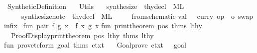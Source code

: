 %
\begin{isabellebody}%
%
%
\isadelimdocument
%
\endisadelimdocument
%
\isatagdocument
%
\isamarkuptrue%
%
\endisatagdocument
{\isafolddocument}%
%
\isadelimdocument
%
\endisadelimdocument
%
\isadelimtheory
%
\endisadelimtheory
%
\isatagtheory
{}\isamarkupfalse%
\ Synthetic{\isacharunderscore}{\kern0pt}Definition\isanewline
\ \ \ Utils\isanewline
\ \ \ {\isachardoublequoteopen}synthesize{\isachardoublequoteclose}\ {\isacharcolon}{\kern0pt}{\isacharcolon}{\kern0pt}\ thy{\isacharunderscore}{\kern0pt}decl\ {\isacharpercent}{\kern0pt}\ {\isachardoublequoteopen}ML{\isachardoublequoteclose}\isanewline
\ \ \ \ \ {\isachardoublequoteopen}synthesize{\isacharunderscore}{\kern0pt}notc{\isachardoublequoteclose}\ {\isacharcolon}{\kern0pt}{\isacharcolon}{\kern0pt}\ thy{\isacharunderscore}{\kern0pt}decl\ {\isacharpercent}{\kern0pt}\ {\isachardoublequoteopen}ML{\isachardoublequoteclose}\isanewline
\ \ \ \ \ {\isachardoublequoteopen}from{\isacharunderscore}{\kern0pt}schematic{\isachardoublequoteclose}\isanewline
{}%
\endisatagtheory
{\isafoldtheory}%
%
\isadelimtheory
\isanewline
%
\endisadelimtheory
%
\isadelimML
\isanewline
%
\endisadelimML
%
\isatagML
{}\isamarkupfalse%
{\isacartoucheopen}\isanewline
val\ {\isachardollar}{\kern0pt}{\isacharbackquote}{\kern0pt}\ {\isacharequal}{\kern0pt}\ curry\ {\isacharparenleft}{\kern0pt}{\isacharparenleft}{\kern0pt}op\ {\isachardollar}{\kern0pt}{\isacharparenright}{\kern0pt}\ o\ swap{\isacharparenright}{\kern0pt}\isanewline
infix\ {\isachardollar}{\kern0pt}{\isacharbackquote}{\kern0pt}\isanewline
\isanewline
fun\ pair\ f\ g\ x\ {\isacharequal}{\kern0pt}\ {\isacharparenleft}{\kern0pt}f\ x{\isacharcomma}{\kern0pt}\ g\ x{\isacharparenright}{\kern0pt}\isanewline
\isanewline
fun\ print{\isacharunderscore}{\kern0pt}theorem\ pos\ {\isacharparenleft}{\kern0pt}thms{\isacharcomma}{\kern0pt}\ lthy{\isacharparenright}{\kern0pt}\ {\isacharequal}{\kern0pt}\isanewline
\ \ {\isacharparenleft}{\kern0pt}Proof{\isacharunderscore}{\kern0pt}Display{\isachardot}{\kern0pt}print{\isacharunderscore}{\kern0pt}theorem\ pos\ lthy\ thms{\isacharsemicolon}{\kern0pt}\ lthy{\isacharparenright}{\kern0pt}\isanewline
\isanewline
fun\ prove{\isacharunderscore}{\kern0pt}tc{\isacharunderscore}{\kern0pt}form\ goal\ thms\ ctxt\ {\isacharequal}{\kern0pt}\isanewline
\ \ Goal{\isachardot}{\kern0pt}prove\ ctxt\ {\isacharbrackleft}{\kern0pt}{\isacharbrackright}{\kern0pt}\ {\isacharbrackleft}{\kern0pt}{\isacharbrackright}{\kern0pt}\ goal\isanewline

\end{isabellebody}
